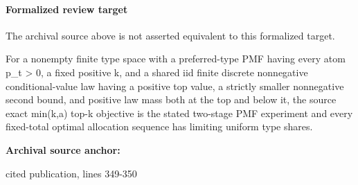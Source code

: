 \documentclass[10pt]{article}
\begin{document}
\paragraph{Formalized review target}
The archival source above is not asserted equivalent to this formalized target.
\begin{ReviewVerbatim}
For a nonempty finite type space with a preferred-type PMF having every atom p_t > 0, a fixed positive k, and a shared iid finite discrete nonnegative conditional-value law having a positive top value, a strictly smaller nonnegative second bound, and positive law mass both at the top and below it, the source exact min(k,a) top-k objective is the stated two-stage PMF experiment and every fixed-total optimal allocation sequence has limiting uniform type shares.
\end{ReviewVerbatim}

\textbf{Archival source anchor:} {\footnotesize\raggedright cited publication, lines 349-\allowbreak{}350\par}
\end{document}

